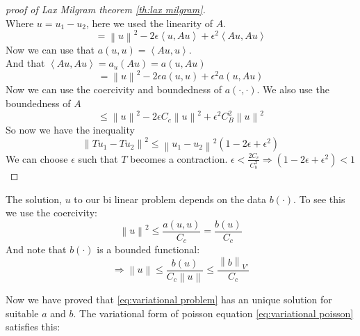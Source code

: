\documentclass[../Main/main.tex]{subfiles}
\begin{document}
\begin{proof}[proof of Lax Milgram theorem \ref{th:lax milgram}]
\begin{equation*}
		\end{equation*}
		Where $u = u_1 - u_2$, here we used the linearity of $A$.
		\begin{equation*}
			=\left \| u \right \|^2 - 2 \epsilon \left \langle u,Au \right \rangle + \epsilon^2 \left \langle Au,Au \right\rangle
		\end{equation*}
		Now we can use that $a(u,u)=\left \langle Au,u \right \rangle$.\\
		And that $\left \langle Au,Au \right \rangle = a_u(Au) = a(u,Au)$ 
		\begin{equation*}
			=\left \| u \right \|^2 - 2\epsilon a(u,u) + \epsilon^2 a(u,Au)
		\end{equation*}
		Now we can use the coercivity and boundedness of $a(\cdot,\cdot)$. We also use the boundedness of $A$
		\begin{equation*}
			\leq \left \|u  \right \|^2 -2\epsilon C_c \left \| u \right \|^2 + \epsilon^2 C_B^2 \left \|u  \right \|^2
		\end{equation*}
		So now we have the inequality
		\begin{equation*}
			\left \| Tu_1 -Tu_2 \right \|^2 \leq \left \| u_1 - u_2 \right \|^2 (1-2\epsilon + \epsilon^2)
		\end{equation*}
		We can choose $\epsilon$ such that $T$ becomes a contraction.
		$\epsilon < \frac{2 C_c}{C_b^2} \Rightarrow (1-2\epsilon + \epsilon^2)<1$
	\end{proof}
	\begin{remark}\label{rm:stability}
		The solution, $u$ to our bi linear problem depends on the data $b(\cdot)$. To see this we use the coercivity:
		\begin{equation*}
			\left \| u \right \|^2 \leq \frac{a(u,u)}{C_c} = \frac{b(u)}{C_c}
		\end{equation*}
		And note that $b(\cdot)$ is a bounded functional:
		\begin{equation*}
			\Rightarrow \left \| u \right \| \leq \frac{b(u)}{C_c \left \|u\right \|} \leq \frac{\left \| b \right \|_{V'}}{C_c}
		\end{equation*}
	\end{remark}
	Now we have proved that \eqref{eq:variational problem} has an unique solution for suitable $a$ and $b$. The variational form of poisson equation \eqref{eq:variational poisson} satisfies this:
\end{document}
